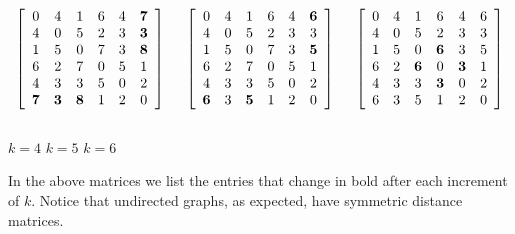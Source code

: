 \begin{Example}
\begin{samepage}
{\[
\left[
\begin{array}{cccccc} %
0    & 4   & 1   & 6    & 4    & \textbf{7} \\
4    & 0   & 5   & 2    & 3    & \textbf{3} \\
1    & 5   & 0   & 7    & 3    & \textbf{8} \\
6    & 2   & 7   & 0    & 5    & 1 \\
4    & 3   & 3   & 5    & 0    & 2 \\
\textbf{7} &\textbf{3} & \textbf{8} & 1    & 2    & 0 \\
\end{array}
\right]
\hspace{.5cm}
\left[
\begin{array}{cccccc} %
0    & 4   & 1     & 6    & 4    & \textbf{6} \\
4    & 0   & 5     & 2    & 3    & 3 \\
1    & 5   & 0     & 7    & 3    & \textbf{5} \\
6    & 2   & 7     & 0    & 5    & 1 \\
4    & 3   & 3     & 5    & 0    & 2 \\
\textbf{6} & 3   & \textbf{5} & 1    & 2    & 0 \\
\end{array}
\right]
\hspace{.5cm}
\left[
\begin{array}{cccccc} %
0    & 4   & 1     & 6    & 4    & 6 \\
4    & 0   & 5     & 2    & 3    & 3 \\
1    & 5   & 0     & \textbf{6} & 3    & 5 \\
6    & 2   & \textbf{6} & 0    & \textbf{3} & 1 \\
4    & 3   & 3     & \textbf{3} & 0    & 2 \\
6    & 3   & 5     & 1    & 2    & 0 \\
\end{array}
\right]
\]\\[-5pt]
\hspace*{1in} $k=4$ \hspace{1.2in} $k=5$ \hspace{1.2in} $k=6$
\\
} %
\end{samepage}

In the above matrices we list the entries that change in bold after each
increment of $k$. Notice that undirected graphs, as expected, have
symmetric distance matrices.
\end{Example}

